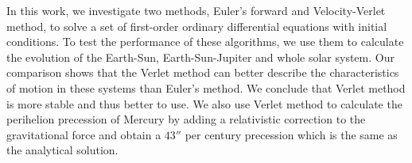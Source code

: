 In this work, we investigate two methods, Euler's forward and Velocity-Verlet method, 
to solve a set of first-order ordinary differential equations with initial conditions. 
To test the performance of these algorithms, 
we use them to calculate the evolution of the Earth-Sun, Earth-Sun-Jupiter and whole solar system. 
Our comparison shows that the Verlet method can better describe the characteristics of motion in these systems than Euler's method. 
We conclude that Verlet method is more stable and thus better to use. 
We also use Verlet method to calculate the perihelion precession of Mercury by adding a relativistic correction to the gravitational force 
and obtain a $43''$ per century precession which is the same as the analytical solution. 